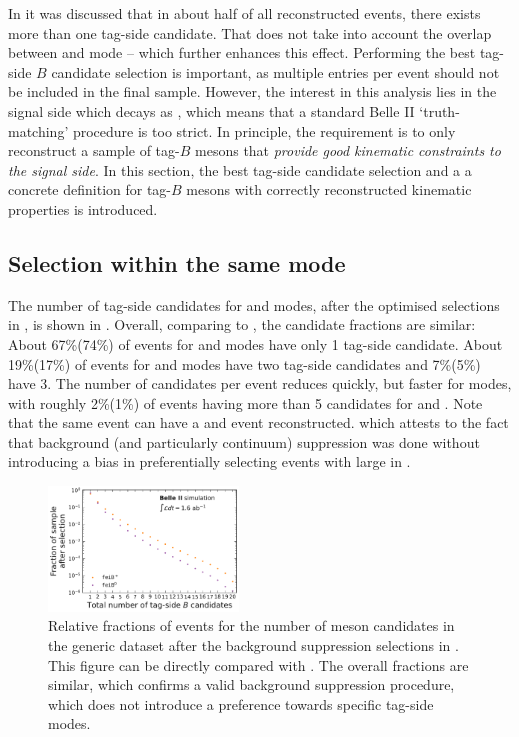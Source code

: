 In  it was discussed that in about half of all reconstructed events, there exists more than one tag-side candidate.
That does not take into account the overlap between \feiBp and \feiBz mode -- which further enhances this effect.
Performing the best tag-side $B$ candidate selection is important, as multiple entries per event should not be included in the final sample.
However, the interest in this analysis lies in the signal side which decays as \BtoXsgamma, which means that a standard Belle II `truth-matching' procedure is too strict.
In principle, the requirement is to only reconstruct a sample of tag-$B$ mesons that \textit{provide good kinematic constraints to the signal side}.
In this section, the best tag-side candidate selection and a
 a concrete definition for tag-$B$ mesons with correctly reconstructed kinematic properties is introduced.

\subsection{Selection within the same \texorpdfstring{\FEI}{FEI} mode}\label{sec:select_tag_between_modes}

The number of tag-side candidates for \feiBp and \feiBz modes, after the optimised selections in ,
is shown in .
Overall, comparing to , the candidate fractions are similar:
About 67\%(74\%) of events for \feiBp and \feiBz modes have only 1 tag-side candidate.
About 19\%(17\%) of events for \feiBp and \feiBz modes have two tag-side candidates and 7\%(5\%) have 3.
The number of candidates per event reduces quickly, but faster for \Bz modes, 
with roughly 2\%(1\%) of events having more than 5 candidates for \Bp and \Bz.
Note that the same event can have a \Bp and \Bz event reconstructed.
which attests to the fact that background (and particularly continuum) suppression was done without introducing a bias in preferentially selecting events with large \feiProb in .

\begin{figure}[htbp!]
    \centering
    \includegraphics[width=0.45\textwidth]{figures/event_reconstruction/Bboth_total_tag_candidates.pdf}
    \caption{\label{fig:fei_tag_reco_candidates_post_optimisation} 
    Relative fractions of events for the number of \B meson candidates in the generic \MC dataset after the background suppression selections in .
    This figure can be directly compared with .
    The overall fractions are similar, which confirms a valid background suppression procedure, which does not introduce a preference towards specific tag-side modes.
    }
\end{figure}

